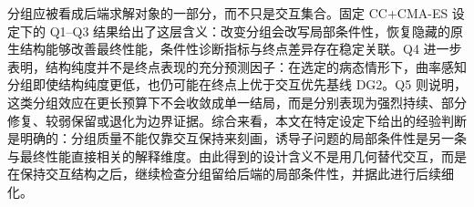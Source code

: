 分组应被看成后端求解对象的一部分，而不只是交互集合。固定 CC+CMA-ES 设定下的 Q1--Q3 结果给出了这层含义：改变分组会改写局部条件性，恢复隐藏的原生结构能够改善最终性能，条件性诊断指标与终点差异存在稳定关联。Q4 进一步表明，结构纯度并不是终点表现的充分预测因子：在选定的病态情形下，曲率感知分组即使结构纯度更低，也仍可能在终点上优于交互优先基线 DG2。Q5 则说明，这类分组效应在更长预算下不会收敛成单一结局，而是分别表现为强烈持续、部分修复、较弱保留或退化为边界证据。综合来看，本文在特定设定下给出的经验判断是明确的：分组质量不能仅靠交互保持来刻画，诱导子问题的局部条件性是另一条与最终性能直接相关的解释维度。由此得到的设计含义不是用几何替代交互，而是在保持交互结构之后，继续检查分组留给后端的局部条件性，并据此进行后续细化。
